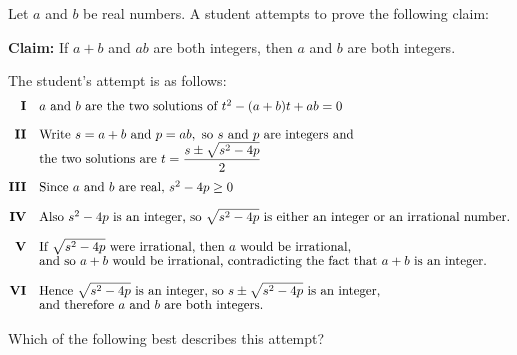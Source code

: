 \documentclass[11pt,a4paper]{article}
\begin{document}
\clearpage
\thispagestyle{djspaper}
\vspace*{8pt}
\begin{enumerate}[label=\textbf{\arabic*.},leftmargin=*,itemsep=0pt,start=6]
Let $a$ and $b$ be real numbers. A student attempts to prove the following claim: 
\begin{center} \begin{minipage}{0.82\linewidth} \centering \textbf{Claim:} If $a+b$ and $ab$ are both integers, then $a$ and $b$ are both integers. \end{minipage} \end{center}

The student's attempt is as follows:\[
\begin{array}{@{}rl@{}}
\textbf{I} &
\text{$a$ and $b$ are the two solutions of }
t^2-(a+b)t+ab=0 \\[10pt]

\textbf{II} &
\text{Write }s=a+b\text{ and }p=ab,\text{ so }s\text{ and }p\text{ are integers and} \\[-1pt]
&
\displaystyle
\text{the two solutions are }
t=\frac{s\pm\sqrt{s^2-4p}}{2} \\[10pt]

\textbf{III} &
\text{Since }a\text{ and }b\text{ are real, }s^2-4p\geq0 \\[10pt]

\textbf{IV} &
\text{Also }s^2-4p\text{ is an integer, so }\sqrt{s^2-4p}
\text{ is either an integer or an irrational number.} \\[10pt]

\textbf{V} &
\text{If }\sqrt{s^2-4p}\text{ were irrational, then }a\text{ would be irrational,} \\[-1pt]
&
\text{and so }a+b\text{ would be irrational, contradicting the fact that }
a+b\text{ is an integer.} \\[10pt]

\textbf{VI} &
\text{Hence }\sqrt{s^2-4p}\text{ is an integer, so }
s\pm\sqrt{s^2-4p}\text{ is an integer,} \\[-1pt]
&
\text{and therefore }a\text{ and }b\text{ are both integers.}
\end{array}
\]

Which of the following best describes this attempt?


\end{enumerate}
\end{document}
